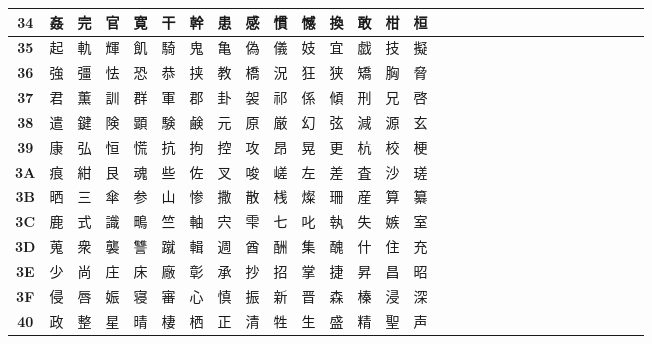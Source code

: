 \begin{table}[H]
\begin{tabular}{|Sc|Sc|Sc|Sc|Sc|Sc|Sc|Sc|Sc|Sc|Sc|Sc|Sc|Sc|Sc|}
\textbf{34} & 姦 & 完 & 官 & 寛 & 干 & 幹 & 患 & 感 & 慣 & 憾 & 換 & 敢 & 柑 & 桓 \\ \hline
\textbf{35} & 起 & 軌 & 輝 & 飢 & 騎 & 鬼 & 亀 & 偽 & 儀 & 妓 & 宜 & 戯 & 技 & 擬 \\ \hline
\textbf{36} & 強 & 彊 & 怯 & 恐 & 恭 & 挟 & 教 & 橋 & 況 & 狂 & 狭 & 矯 & 胸 & 脅 \\ \hline
\textbf{37} & 君 & 薫 & 訓 & 群 & 軍 & 郡 & 卦 & 袈 & 祁 & 係 & 傾 & 刑 & 兄 & 啓 \\ \hline
\textbf{38} & 遣 & 鍵 & 険 & 顕 & 験 & 鹸 & 元 & 原 & 厳 & 幻 & 弦 & 減 & 源 & 玄 \\ \hline
\textbf{39} & 康 & 弘 & 恒 & 慌 & 抗 & 拘 & 控 & 攻 & 昂 & 晃 & 更 & 杭 & 校 & 梗 \\ \hline
\textbf{3A} & 痕 & 紺 & 艮 & 魂 & 些 & 佐 & 叉 & 唆 & 嵯 & 左 & 差 & 査 & 沙 & 瑳 \\ \hline
\textbf{3B} & 晒 & 三 & 傘 & 参 & 山 & 惨 & 撒 & 散 & 桟 & 燦 & 珊 & 産 & 算 & 纂 \\ \hline
\textbf{3C} & 鹿 & 式 & 識 & 鴫 & 竺 & 軸 & 宍 & 雫 & 七 & 叱 & 執 & 失 & 嫉 & 室 \\ \hline
\textbf{3D} & 蒐 & 衆 & 襲 & 讐 & 蹴 & 輯 & 週 & 酋 & 酬 & 集 & 醜 & 什 & 住 & 充 \\ \hline
\textbf{3E} & 少 & 尚 & 庄 & 床 & 廠 & 彰 & 承 & 抄 & 招 & 掌 & 捷 & 昇 & 昌 & 昭 \\ \hline
\textbf{3F} & 侵 & 唇 & 娠 & 寝 & 審 & 心 & 慎 & 振 & 新 & 晋 & 森 & 榛 & 浸 & 深 \\ \hline
\textbf{40} & 政 & 整 & 星 & 晴 & 棲 & 栖 & 正 & 清 & 牲 & 生 & 盛 & 精 & 聖 & 声 \\ \hline
\end{tabular}
\end{table}

